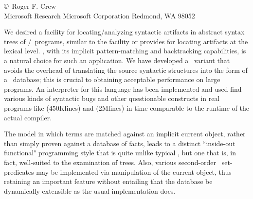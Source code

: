 \secdown
{}
\copyright\ Roger F. Crew \\
Microsoft Research
Microsoft Corporation
Redmond, WA 98052


We desired a facility for locating/analyzing syntactic artifacts in abstract
syntax trees of \ci/\cpp\ programs, similar to the facility  or
 provides for locating artifacts at the lexical level. \prolog, with
its implicit pattern-matching and backtracking capabilities, is a natural choice
for such an application. We have developed a \prolog\ variant that avoids the
overhead of translating the source syntactic structures into the form of a
\prolog\ database; this is crucial to obtaining acceptable performance on large
programs. An interpreter for this language has been implemented and used find
various kinds of syntactic bugs and other questionable constructs in real
programs like  (450Klines) and 
(2Mlines) in time comparable to the runtime of the actual compiler.

The model in which terms are matched against an implicit current object, rather
than simply proven against a database of facts, leads to a distinct ``inside-out
functional" programming style that is quite unlike typical \prolog, but one that
is, in fact, well-suited to the examination of trees. Also, various second-order
\prolog\ set-predicates may be implemented via manipulation of the current
object, thus retaining an important feature without entailing that the database
be dynamically extensible as the usual implementation does.


\secup
